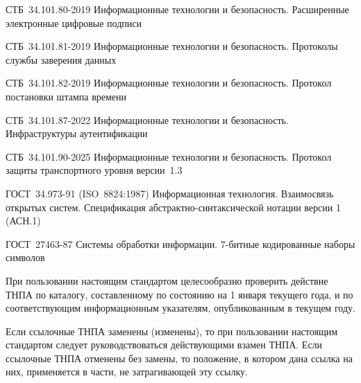 СТБ~34.101.80-2019 Информационные технологии и безопасность. Расширенные
электронные цифровые подписи

СТБ~34.101.81-2019 Информационные технологии и безопасность. Протоколы службы
заверения данных

СТБ~34.101.82-2019 Информационные технологии и безопасность. Протокол постановки
штампа времени

СТБ~34.101.87-2022 Информационные технологии и безопасность. Инфраструктуры 
аутентификации

СТБ~34.101.90-2025 Информационные технологии и безопасность. Протокол 
защиты транспортного уровня версии~1.3

ГОСТ~34.973-91 (ISO~8824:1987) Информационная технология. Взаимосвязь 
открытых систем. Спецификация абстрактно-синтаксической нотации версии 1 
(АСН.1) 

ГОСТ~27463-87 Системы обработки информации. 7-битные кодированные наборы
символов

\begin{note*}
При пользовании настоящим стандартом целесообразно проверить
действие ТНПА по каталогу, составленному по состоянию на 1 января текущего года,
и по соответствующим информационным указателям, опубликованным в текущем году.

Если ссылочные ТНПА заменены (изменены), то при пользовании настоящим стандартом
следует руководствоваться действующими взамен ТНПА. Если ссылочные ТНПА отменены
без замены, то положение, в котором дана ссылка на них, применяется в части, не
затрагивающей эту ссылку.
\end{note*}
